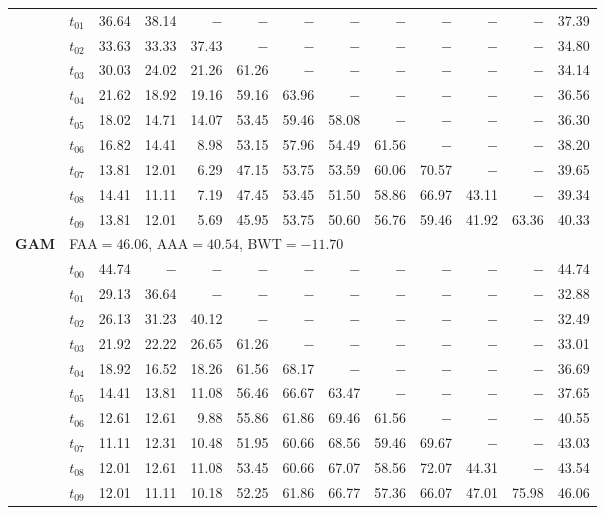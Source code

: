 \begin{table}[ht]
\begin{tabular}{@{}l l r r r r r r r r r r r@{}}
 & $t_{01}$ & 36.64 & 38.14 & $-$ & $-$ & $-$ & $-$ & $-$ & $-$ & $-$ & $-$ & 37.39 \\
 & $t_{02}$ & 33.63 & 33.33 & 37.43 & $-$ & $-$ & $-$ & $-$ & $-$ & $-$ & $-$ & 34.80 \\
 & $t_{03}$ & 30.03 & 24.02 & 21.26 & 61.26 & $-$ & $-$ & $-$ & $-$ & $-$ & $-$ & 34.14 \\
 & $t_{04}$ & 21.62 & 18.92 & 19.16 & 59.16 & 63.96 & $-$ & $-$ & $-$ & $-$ & $-$ & 36.56 \\
 & $t_{05}$ & 18.02 & 14.71 & 14.07 & 53.45 & 59.46 & 58.08 & $-$ & $-$ & $-$ & $-$ & 36.30 \\
 & $t_{06}$ & 16.82 & 14.41 & 8.98 & 53.15 & 57.96 & 54.49 & 61.56 & $-$ & $-$ & $-$ & 38.20 \\
 & $t_{07}$ & 13.81 & 12.01 & 6.29 & 47.15 & 53.75 & 53.59 & 60.06 & 70.57 & $-$ & $-$ & 39.65 \\
 & $t_{08}$ & 14.41 & 11.11 & 7.19 & 47.45 & 53.45 & 51.50 & 58.86 & 66.97 & 43.11 & $-$ & 39.34 \\
 & $t_{09}$ & 13.81 & 12.01 & 5.69 & 45.95 & 53.75 & 50.60 & 56.76 & 59.46 & 41.92 & 63.36 & 40.33 \\
\midrule
\multirow{11}{*}{\textbf{GAM}} & \multicolumn{12}{l}{\quad\small FAA$=46.06$,\; AAA$=40.54$,\; BWT$=-11.70$} \\
 & $t_{00}$ & 44.74 & $-$ & $-$ & $-$ & $-$ & $-$ & $-$ & $-$ & $-$ & $-$ & 44.74 \\
 & $t_{01}$ & 29.13 & 36.64 & $-$ & $-$ & $-$ & $-$ & $-$ & $-$ & $-$ & $-$ & 32.88 \\
 & $t_{02}$ & 26.13 & 31.23 & 40.12 & $-$ & $-$ & $-$ & $-$ & $-$ & $-$ & $-$ & 32.49 \\
 & $t_{03}$ & 21.92 & 22.22 & 26.65 & 61.26 & $-$ & $-$ & $-$ & $-$ & $-$ & $-$ & 33.01 \\
 & $t_{04}$ & 18.92 & 16.52 & 18.26 & 61.56 & 68.17 & $-$ & $-$ & $-$ & $-$ & $-$ & 36.69 \\
 & $t_{05}$ & 14.41 & 13.81 & 11.08 & 56.46 & 66.67 & 63.47 & $-$ & $-$ & $-$ & $-$ & 37.65 \\
 & $t_{06}$ & 12.61 & 12.61 & 9.88 & 55.86 & 61.86 & 69.46 & 61.56 & $-$ & $-$ & $-$ & 40.55 \\
 & $t_{07}$ & 11.11 & 12.31 & 10.48 & 51.95 & 60.66 & 68.56 & 59.46 & 69.67 & $-$ & $-$ & 43.03 \\
 & $t_{08}$ & 12.01 & 12.61 & 11.08 & 53.45 & 60.66 & 67.07 & 58.56 & 72.07 & 44.31 & $-$ & 43.54 \\
 & $t_{09}$ & 12.01 & 11.11 & 10.18 & 52.25 & 61.86 & 66.77 & 57.36 & 66.07 & 47.01 & 75.98 & 46.06 \\

\end{tabular}
\end{table}
